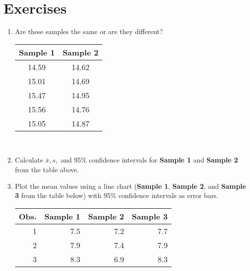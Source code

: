 \section{Exercises}

\begin{enumerate}
\item Are these samples the same or are they different?

\begin{tabular}{|c|c|}
\hline \textbf{Sample 1} & \textbf{Sample 2} \\ 
\hline 14.59 & 14.62 \\ 
\hline 15.01 & 14.69 \\ 
\hline 15.47 & 14.95 \\ 
\hline 15.56 & 14.76 \\ 
\hline 15.05 & 14.87 \\ 
\hline 

\end{tabular}\\
\item Calculate $ \bar{x}, s, $ and 95\% confidence intervals for \textbf{Sample 1} and \textbf{Sample 2} from the table above.
\item Plot the mean values using a line chart (\textbf{Sample 1}, \textbf{Sample 2}, and \textbf{Sample 3} from the table below) with 95\% confidence intervals as error bars.

\begin{tabular}{|r|r|r|r|}
\hline Obs. & \textbf{Sample 1} & \textbf{Sample 2} & \textbf{Sample 3} \\ 
\hline 1 & 7.5 & 7.2 & 7.7 \\ 
\hline 2 & 7.9 & 7.4 & 7.9 \\ 
\hline 3 & 8.3 & 6.9 & 8.3 \\ 
\hline 
\end{tabular} 

\end{enumerate}